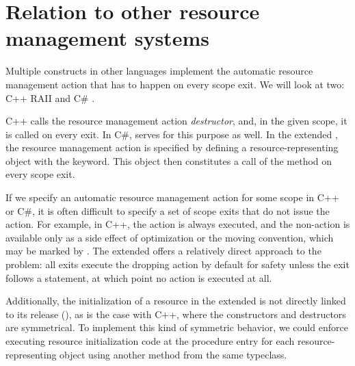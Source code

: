 \section{Relation to other resource management systems}
\label{sec:OtherRAII}

Multiple constructs in other languages implement the automatic resource management action that has to happen on every scope exit. We will look at two: C++ RAII and C\# .

C++ calls the resource management action \emph{destructor}, and, in the given scope, it is called on every exit. In C\#,  serves for this purpose as well. In the extended \cmm, the resource management action is specified by defining a resource-representing object with the  keyword. This object then constitutes a call of the  method on every scope exit.

If we specify an automatic resource management action for some scope in C++ or C\#, it is often difficult to specify a set of scope exits that do not issue the action. For example, in C++, the action is always executed, and the non-action is available only as a side effect of optimization or the moving convention, which may be marked by . The extended \cmm offers a relatively direct approach to the problem: all exits execute the dropping action by default for safety unless the exit follows a  statement, at which point no action is executed at all.

Additionally, the initialization of a resource in the extended \cmm is not directly linked to its release (), as is the case with C++, where the constructors and destructors are symmetrical. To implement this kind of symmetric behavior, we could enforce executing resource initialization code at the procedure entry for each resource-representing object using another method from the same typeclass.
